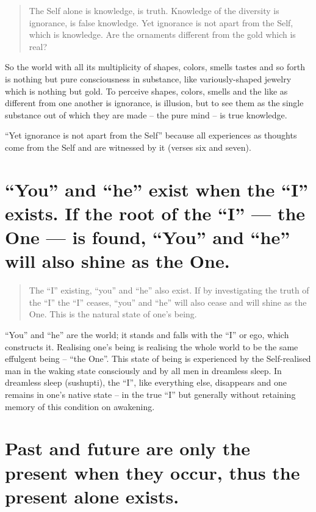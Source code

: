 \documentclass[12pt]{report}
\begin{document}
\begin{quote}
  The Self alone is knowledge, is truth. Knowledge of the diversity is
  ignorance, is false knowledge. Yet ignorance is not apart from the
  Self, which is knowledge. Are the ornaments different from the gold
  which is real?
\end{quote}


So the world with all its multiplicity of shapes, colors, smells
tastes and so forth is nothing but pure consciousness in substance,
like variously-shaped jewelry which is nothing but gold. To perceive
shapes, colors, smells and the like as different from one another is
ignorance, is illusion, but to see them as the single substance out of
which they are made -- the pure mind -- is true knowledge.

``Yet ignorance is not apart from the Self'' because all experiences
as thoughts come from the Self and are witnessed by it (verses six and
seven). 

\section{ ``You'' and ``he'' exist when the ``I'' exists. If the
  root of the ``I'' --- the One --- is found, ``You'' and ``he'' will
  also shine as the One.}

\begin{quote}
  The ``I'' existing, ``you'' and ``he'' also exist. If by investigating
  the truth of the ``I'' the ``I'' ceases, ``you'' and ``he'' will also
  cease and will shine as the One. This is the natural state of one's
  being.

\end{quote}

``You'' and ``he'' are the world; it stands and falls with the ``I''
or ego, which constructs it. Realising one's being is realising the
whole world to be the same effulgent being -- ``the One''. This state
of being is experienced by the Self-realised man in the waking state
consciously and by all men in dreamless sleep. In dreamless sleep
(sushupti), the ``I'', like everything else, disappears and one
remains in one's native state -- in the true ``I'' but generally
without retaining memory of this condition on awakening.

\section{ Past and future are only the present when they occur,
  thus the present alone exists.}
\end{document}
